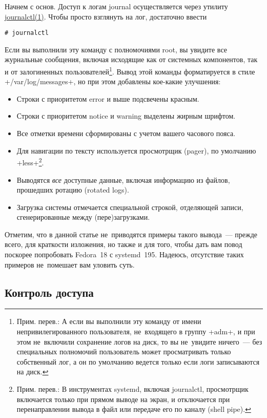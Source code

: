 \documentclass[10pt,oneside,a4paper]{article}
\begin{document}
Начнем с основ. Доступ к логам journal осуществляется через утилиту
\href{http://www.freedesktop.org/software/systemd/man/journalctl.html}{journalctl(1)}.
Чтобы просто взглянуть на лог, достаточно ввести
\begin{Verbatim}
# journalctl
\end{Verbatim}
Если вы выполнили эту команду с полномочиями root, вы увидите все
журнальные сообщения, включая исходящие как от системных компонентов, так и от
залогиненных пользователей\footnote{Прим. перев.: А если вы выполнили эту
команду от имени непривилегированного пользователя, не~входящего в группу
+adm+, и при этом не~включили сохранение логов на диск, то вы не~увидите
ничего~--- без специальных полномочий пользователь может просматривать только
собственный лог, а он по умолчанию ведется только если логи записываются на
диск.}. Вывод этой команды форматируется в стиле
+/var/log/messages+, но при этом добавлены кое-какие улучшения:
\begin{itemize}
	\item Строки с приоритетом error и выше подсвечены красным.
	\item Строки с приоритетом notice и warning выделены жирным шрифтом.
	\item Все отметки времени сформированы с учетом вашего часового пояса.
	\item Для навигации по тексту используется просмотрщик (pager), по
		умолчанию +less+\footnote{Прим. перев.: В инструментах systemd,
		включая journalctl, просмотрщик включается только при прямом 
		выводе на экран, и отключается при перенаправлении вывода в файл
		или передаче его по каналу (shell pipe).}.
	\item Выводятся \emph{все} доступные данные, включая информацию из
		файлов, прошедших ротацию (rotated logs).
	\item Загрузка системы отмечается специальной строкой, отделяющей
		записи, сгенерированные между (пере)загрузками.
\end{itemize}

Отметим, что в данной статье не~приводятся примеры такого вывода~--- прежде
всего, для краткости изложения, но также и для того, чтобы дать вам повод
поскорее попробовать Fedora~18 с systemd~195. Надеюсь, отсутствие таких примеров
не~помешает вам уловить суть.

\subsection{Контроль доступа}
\end{document}
